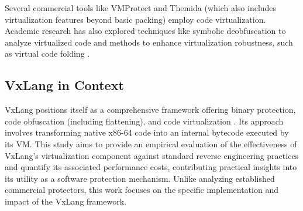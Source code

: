 Several commercial tools like VMProtect \cite{VMP24} and Themida \cite{Ore24} (which also includes virtualization features beyond basic packing) employ code virtualization. Academic research has also explored techniques like symbolic deobfuscation to analyze virtualized code \cite{Salwan2018SymbolicDeobfuscation} and methods to enhance virtualization robustness, such as virtual code folding \cite{Don20}.

\subsection{VxLang in Context}
VxLang positions itself as a comprehensive framework offering binary protection, code obfuscation (including flattening), and code virtualization \cite{VxLang}. Its approach involves transforming native x86-64 code into an internal bytecode executed by its VM. This study aims to provide an empirical evaluation of the effectiveness of VxLang's virtualization component against standard reverse engineering practices and quantify its associated performance costs, contributing practical insights into its utility as a software protection mechanism. Unlike analyzing established commercial protectors, this work focuses on the specific implementation and impact of the VxLang framework.
